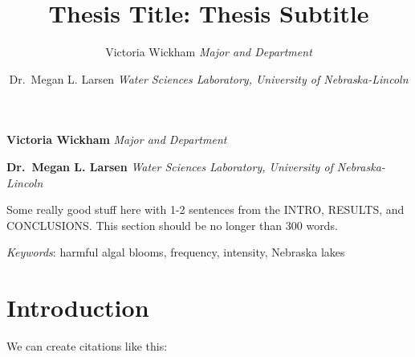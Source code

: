 \documentclass[11pt,]{article}
\title{Thesis Title: Thesis Subtitle  }
\author{\Large Victoria Wickham\vspace{0.05in} \newline\normalsize\emph{Major and Department}   \and \Large Dr.~Megan L. Larsen\vspace{0.05in} \newline\normalsize\emph{Water Sciences Laboratory, University of Nebraska-Lincoln}  }
\date{}
\newcommand*{\authorfont}{\fontfamily{phv}\selectfont}
\renewenvironment{abstract}
 {{%
    \setlength{\leftmargin}{0mm}
    \setlength{\rightmargin}{\leftmargin}%
  }%
  \relax}
 {\endlist}
\begin{document}
	
%

{%
\setlength{\parindent}{0pt}
\thispagestyle{plain}
{\fontsize{18}{20}\selectfont\raggedright 
\maketitle  %

}

{
   \vskip 13.5pt\relax \normalsize\fontsize{11}{12} 
\textbf{\authorfont Victoria Wickham} \hskip 15pt \emph{\small Major and Department}   \par \textbf{\authorfont Dr.~Megan L. Larsen} \hskip 15pt \emph{\small Water Sciences Laboratory, University of Nebraska-Lincoln}   

}

}







\begin{abstract}

    \hbox{\vrule height .2pt width 39.14pc}

    \vskip 8.5pt %

\noindent Some really good stuff here with 1-2 sentences from the INTRO, RESULTS,
and CONCLUSIONS. This section should be no longer than 300 words.


\vskip 8.5pt \noindent \emph{Keywords}: harmful algal blooms, frequency, intensity, Nebraska lakes \par

    \hbox{\vrule height .2pt width 39.14pc}



\end{abstract}


\vskip 6.5pt

\noindent   \clearpage
\tableofcontents  \newpage
\listoftables  \newpage
\listoffigures  \newpage

\section{Introduction}\label{introduction}

We can create citations like this:
\end{document}

